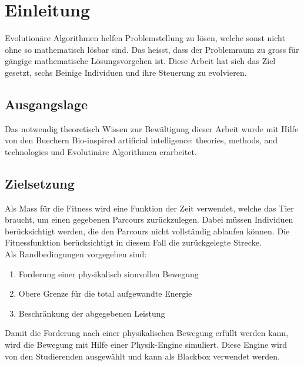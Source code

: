 %
%


\chapter{Einleitung}

Evolutionäre Algorithmen helfen Problemstellung zu lösen, welche sonst nicht ohne so mathematisch lösbar sind.
Das heisst, dass der Problemraum zu gross für gängige mathematische Lösungsvorgehen ist.
Diese Arbeit hat sich das Ziel gesetzt, sechs Beinige Individuen und ihre Steuerung zu evolvieren.

\section{Ausgangslage}

Das notwendig theoretisch Wissen zur Bewältigung dieser Arbeit wurde mit Hilfe von den Buechern
Bio-inspired artificial intelligence: theories, methods, and technologies \cite[]{book:bioInspired} und
Evolutinäre Algorithmen \cite[]{book:evAlgo} erarbeitet.

\section{Zielsetzung}

  Als Mass für die Fitness wird eine Funktion der Zeit verwendet, welche das Tier braucht,
  um einen gegebenen Parcours zurückzulegen.
  Dabei müssen Individuen berücksichtigt werden, die den Parcours nicht vollständig ablaufen können.
  Die Fitnessfunktion berücksichtigt in diesem Fall die zurückgelegte Strecke.
  \\
  Als Randbedingungen vorgegeben sind:
  \begin{enumerate}
    \item Forderung einer physikalisch sinnvollen Bewegung
    \item Obere Grenze für die total aufgewandte Energie
    \item Beschränkung der abgegebenen Leistung
  \end{enumerate}
  Damit die Forderung nach einer physikalischen Bewegung erfüllt werden kann,
  wird die Bewegung mit Hilfe einer Physik-Engine simuliert.
  Diese Engine wird von den Studierenden ausgewählt und kann als Blackbox verwendet werden.

